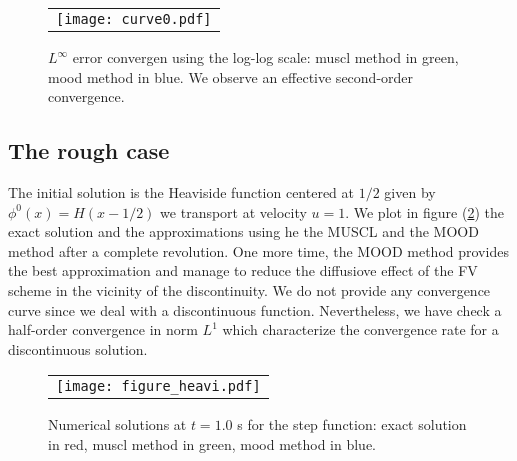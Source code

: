 \begin{figure}[t]
\begin{center}
\begin{tabular}{c}
\texttt{[image: curve0.pdf]}
\end{tabular}
\end{center}
\caption{\label{fig_convinfty}  \footnotesize $L^\infty$ error convergen using the log-log scale: 
muscl method in green, mood method in blue.
We observe an effective second-order convergence.}
\end{figure}

\subsection{The rough case}
The initial solution is the Heaviside function centered at $1/2$ given by $\phi^0(x)=H(x-1/2)$ 
we transport at velocity $u=1$.
We plot in figure (\ref{fig_heavi}) the exact solution and the approximations using he the MUSCL and the MOOD method
after a complete revolution. One more time, the MOOD method provides the best approximation and manage to reduce
the diffusiove effect of the FV scheme in the vicinity of the discontinuity.
We do not provide any convergence curve since we deal with a discontinuous function. Nevertheless, we have check a 
half-order convergence in norm $L^1$ which characterize the convergence rate for a discontinuous solution.
\begin{figure}[ht]
\begin{center}
\begin{tabular}{c}
\texttt{[image: figure\_heavi.pdf]}
\end{tabular}
\end{center}
\caption{\label{fig_heavi} Numerical solutions at $t=1.0$ s for the step function: 
exact solution in red, muscl method in green, mood method in blue.}
\end{figure}




